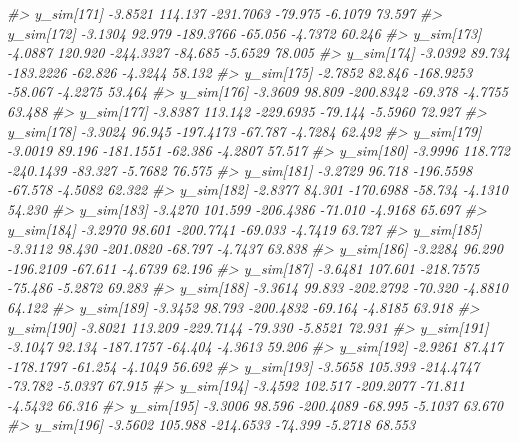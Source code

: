 \documentclass[
  10pt,
  italian,
  a4paper,
  extrafontsizes,onecolumn,openright
  ]{memoir}
\newenvironment{Shaded}{\begin{snugshade}}{\end{snugshade}}
\newcommand{\CommentTok}[1]{\textcolor[rgb]{0.56,0.35,0.01}{\textit{#1}}}
\begin{document}
\begin{Shaded}
\begin{Highlighting}[]
\CommentTok{\#\textgreater{}   y\_sim[171] {-}3.8521 114.137 {-}231.7063 {-}79.975 {-}6.1079 73.597}
\CommentTok{\#\textgreater{}   y\_sim[172] {-}3.1304  92.979 {-}189.3766 {-}65.056 {-}4.7372 60.246}
\CommentTok{\#\textgreater{}   y\_sim[173] {-}4.0887 120.920 {-}244.3327 {-}84.685 {-}5.6529 78.005}
\CommentTok{\#\textgreater{}   y\_sim[174] {-}3.0392  89.734 {-}183.2226 {-}62.826 {-}4.3244 58.132}
\CommentTok{\#\textgreater{}   y\_sim[175] {-}2.7852  82.846 {-}168.9253 {-}58.067 {-}4.2275 53.464}
\CommentTok{\#\textgreater{}   y\_sim[176] {-}3.3609  98.809 {-}200.8342 {-}69.378 {-}4.7755 63.488}
\CommentTok{\#\textgreater{}   y\_sim[177] {-}3.8387 113.142 {-}229.6935 {-}79.144 {-}5.5960 72.927}
\CommentTok{\#\textgreater{}   y\_sim[178] {-}3.3024  96.945 {-}197.4173 {-}67.787 {-}4.7284 62.492}
\CommentTok{\#\textgreater{}   y\_sim[179] {-}3.0019  89.196 {-}181.1551 {-}62.386 {-}4.2807 57.517}
\CommentTok{\#\textgreater{}   y\_sim[180] {-}3.9996 118.772 {-}240.1439 {-}83.327 {-}5.7682 76.575}
\CommentTok{\#\textgreater{}   y\_sim[181] {-}3.2729  96.718 {-}196.5598 {-}67.578 {-}4.5082 62.322}
\CommentTok{\#\textgreater{}   y\_sim[182] {-}2.8377  84.301 {-}170.6988 {-}58.734 {-}4.1310 54.230}
\CommentTok{\#\textgreater{}   y\_sim[183] {-}3.4270 101.599 {-}206.4386 {-}71.010 {-}4.9168 65.697}
\CommentTok{\#\textgreater{}   y\_sim[184] {-}3.2970  98.601 {-}200.7741 {-}69.033 {-}4.7419 63.727}
\CommentTok{\#\textgreater{}   y\_sim[185] {-}3.3112  98.430 {-}201.0820 {-}68.797 {-}4.7437 63.838}
\CommentTok{\#\textgreater{}   y\_sim[186] {-}3.2284  96.290 {-}196.2109 {-}67.611 {-}4.6739 62.196}
\CommentTok{\#\textgreater{}   y\_sim[187] {-}3.6481 107.601 {-}218.7575 {-}75.486 {-}5.2872 69.283}
\CommentTok{\#\textgreater{}   y\_sim[188] {-}3.3614  99.833 {-}202.2792 {-}70.320 {-}4.8810 64.122}
\CommentTok{\#\textgreater{}   y\_sim[189] {-}3.3452  98.793 {-}200.4832 {-}69.164 {-}4.8185 63.918}
\CommentTok{\#\textgreater{}   y\_sim[190] {-}3.8021 113.209 {-}229.7144 {-}79.330 {-}5.8521 72.931}
\CommentTok{\#\textgreater{}   y\_sim[191] {-}3.1047  92.134 {-}187.1757 {-}64.404 {-}4.3613 59.206}
\CommentTok{\#\textgreater{}   y\_sim[192] {-}2.9261  87.417 {-}178.1797 {-}61.254 {-}4.1049 56.692}
\CommentTok{\#\textgreater{}   y\_sim[193] {-}3.5658 105.393 {-}214.4747 {-}73.782 {-}5.0337 67.915}
\CommentTok{\#\textgreater{}   y\_sim[194] {-}3.4592 102.517 {-}209.2077 {-}71.811 {-}4.5432 66.316}
\CommentTok{\#\textgreater{}   y\_sim[195] {-}3.3006  98.596 {-}200.4089 {-}68.995 {-}5.1037 63.670}
\CommentTok{\#\textgreater{}   y\_sim[196] {-}3.5602 105.988 {-}214.6533 {-}74.399 {-}5.2718 68.553}

\end{Highlighting}
\end{Shaded}
\end{document}
